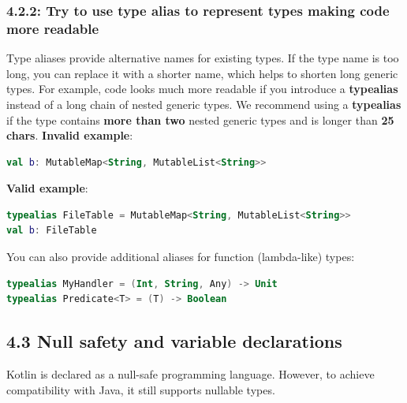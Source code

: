 \subsubsection*{\textbf{4.2.2: Try to use type alias to represent types making code more readable}}
\leavevmode\newline
\label{sec:4.2.2}
Type aliases provide alternative names for existing types.
If the type name is too long, you can replace it with a shorter name, which helps to shorten long generic types.
For example, code looks much more readable if you introduce a \textbf{typealias} instead of a long chain of nested generic types.
We recommend using a \textbf{typealias} if the type contains \textbf{more than two} nested generic types and is longer than \textbf{25 chars}.
\textbf{Invalid example}:
\begin{lstlisting}[language=Kotlin]
val b: MutableMap<String, MutableList<String>>
\end{lstlisting}
\textbf{Valid example}:
\begin{lstlisting}[language=Kotlin]
typealias FileTable = MutableMap<String, MutableList<String>>
val b: FileTable
\end{lstlisting}
You can also provide additional aliases for function (lambda-like) types:
\begin{lstlisting}[language=Kotlin]
typealias MyHandler = (Int, String, Any) -> Unit
typealias Predicate<T> = (T) -> Boolean
\end{lstlisting}
\subsection*{\textbf{4.3 Null safety and variable declarations}}
\label{sec:4.3}
Kotlin is declared as a null-safe programming language. However, to achieve compatibility with Java, it still supports nullable types.
